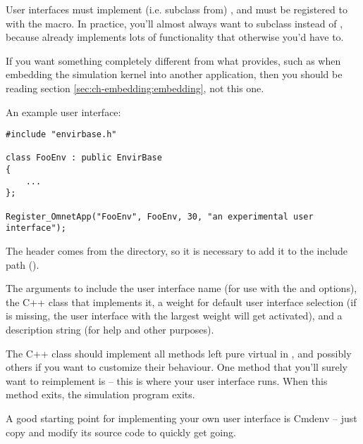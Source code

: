 User interfaces must implement (i.e. subclass from) ,
and must be registered to {\opp} with the  macro.
In practice, you'll almost always want to subclass 
instead of , because  already
implements lots of functionality that otherwise you'd have to.

\begin{note}
If you want something completely different from what 
provides, such as when embedding the simulation kernel into another
application, then you should be reading section \ref{sec:ch-embedding:embedding},
not this one.
\end{note}

An example user interface:

\begin{verbatim}
#include "envirbase.h"

class FooEnv : public EnvirBase
{
    ...
};

Register_OmnetApp("FooEnv", FooEnv, 30, "an experimental user interface");
\end{verbatim}

The  header comes from the  directory,
so it is necessary to add it to the include path ().

The arguments to  include the user interface name
(for use with the  and  options),
the C++ class that implements it, a weight for default user interface selection
(if  is missing, the user interface with the largest weight will get
activated), and a description string (for help and other purposes).

The C++ class should implement all methods left pure virtual in
, and possibly others if you want to customize
their behaviour. One method that you'll surely want to reimplement is
 -- this is where your user interface runs. When this method
exits, the simulation program exits.

\begin{note}
A good starting point for implementing your own user interface is
Cmdenv -- just copy and modify its source code to quickly get going.
\end{note}



